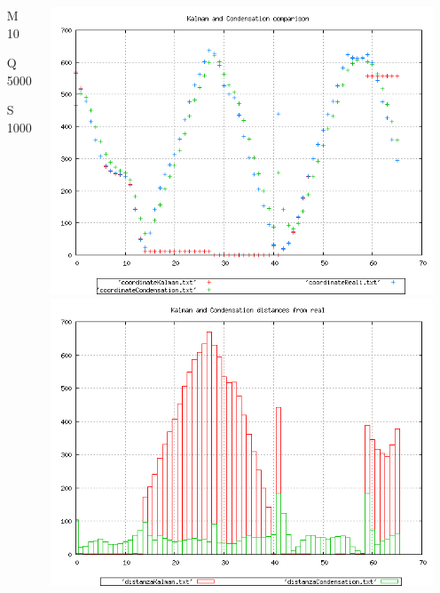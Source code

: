 \documentclass{beamer}
\begin{document}
{\begin{columns}
\begin{scriptsize}
\begin{itemize}
\item [M]10
\item [Q]5000
\item [S]1000
\end{itemize}
\end{scriptsize}
\includegraphics[scale=0.1]{../esperimenti/single_car/mod_10-Q_5000-S_1000/plot.png}\\
\includegraphics[scale=0.1]{../esperimenti/single_car/mod_10-Q_5000-S_1000/plot-distances.png}


\end{columns}}
\end{document}
